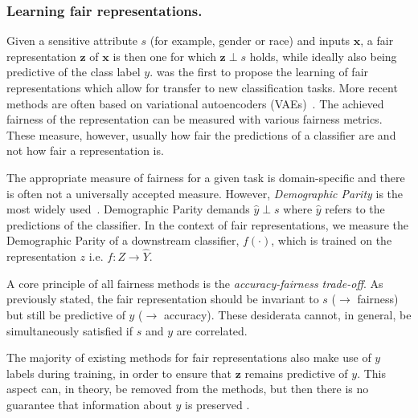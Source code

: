 \subsubsection{Learning fair representations.}
Given a sensitive attribute $s$ (for example, gender or race) and inputs $\bm{x}$,
a fair representation $\bm{z}$ of $\bm{x}$ is then one for which $\bm{z} \perp s$ holds,
while ideally also being predictive of the class label $y$.
\cite{ZemWuSwePitetal13} was the first to propose the learning of fair representations which allow for transfer to new classification tasks.
More recent methods are often based on variational autoencoders (VAEs)~\cite{kingma2013auto,LouSweLi15,edwardsstorkey,beutel}.
The achieved fairness of the representation can be measured with various fairness metrics.
These measure, however, usually how fair the predictions of a classifier are
and not how fair a representation is.

The appropriate measure of fairness for a given task is domain-specific \cite{liu2018delayed}
and there is often not a universally accepted measure.
However, \emph{Demographic Parity} is the most widely used~\cite{LouSweLi15,edwardsstorkey,beutel}.
Demographic Parity demands $\hat{y} \perp s$ where $\hat{y}$ refers to the predictions of the classifier.
In the context of fair representations, we measure the Demographic Parity of a downstream classifier, $f(\cdot )$, which is trained on the representation $z$ i.e.  $f: Z \to \hat{Y}$.

A core principle of all fairness methods is the \emph{accuracy-fairness trade-off}.
As previously stated, the fair representation should be invariant to $s$ ($\to$ fairness) but still be predictive of $y$ ($\to$ accuracy).
These desiderata cannot, in general, be simultaneously satisfied if $s$ and $y$ are correlated.


The majority of existing methods for fair representations also make use of $y$ labels during training,
in order to ensure that $\bm{z}$ remains predictive of $y$.
This aspect can, in theory, be removed from the methods,
but then there is no guarantee that information about $y$ is preserved \cite{LouSweLi15}. 

